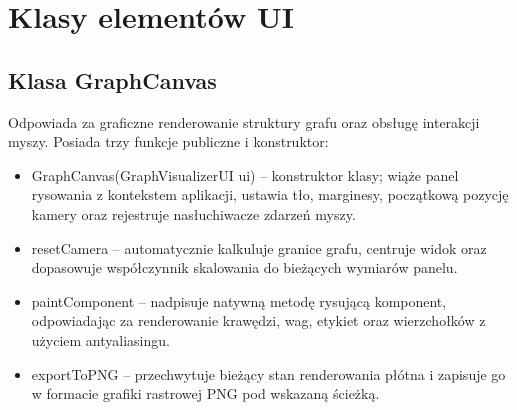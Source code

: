 \documentclass[]{article}
\begin{document}
    \section{Klasy elementów UI}

    \subsection{Klasa GraphCanvas}

    Odpowiada za graficzne renderowanie struktury grafu oraz obsługę interakcji myszy. Posiada trzy funkcje publiczne i konstruktor:

    \begin{itemize}
        \item GraphCanvas(GraphVisualizerUI ui) -- konstruktor klasy; wiąże panel rysowania z kontekstem aplikacji, ustawia tło, marginesy, początkową pozycję kamery oraz rejestruje nasłuchiwacze zdarzeń myszy.
        \item resetCamera -- automatycznie kalkuluje granice grafu, centruje widok oraz dopasowuje współczynnik skalowania do bieżących wymiarów panelu.
        \item paintComponent -- nadpisuje natywną metodę rysującą komponent, odpowiadając za renderowanie krawędzi, wag, etykiet oraz wierzchołków z użyciem antyaliasingu.
        \item exportToPNG -- przechwytuje bieżący stan renderowania płótna i zapisuje go w formacie grafiki rastrowej PNG pod wskazaną ścieżką.
    \end{itemize}
\end{document}
